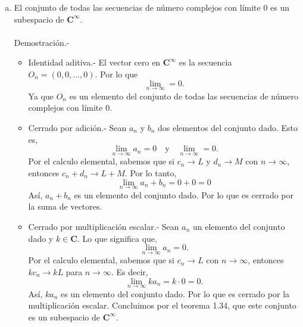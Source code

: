 \begin{enumerate}[\bfseries 1.]
\begin{enumerate}[(a)]
	    \item El conjunto de todas las secuencias de número complejos con límite $0$ es un subespacio de $\textbf{C}^{\infty}$.\\\\
		Demostración.-\;
		\begin{itemize}
		    \item Identidad aditiva.-\; El vector cero en $\textbf{C}^{\infty}$ es la secuencia $O_n=(0,0,\ldots,0)$. Por lo que
			$$\lim_{n\to \infty}=0.$$
		    Ya que $O_n$ es un elemento del conjunto de todas las secuencias de número complejos con límite $0$.

		    \item Cerrado por adición.-\; Sean $a_n$ y $b_n$ dos elementos del conjunto dado. Esto es,
			$$\lim_{n\to \infty}a_n=0\quad \mbox{y}\quad \lim_{n\to \infty}=0.$$
		    Por el calculo elemental, sabemos que si $c_n\to L$ y $d_n\to M$ con $n\to \infty$, entonces $c_n+d_n\to L+M$. Por lo tanto,
		    $$\lim_{n\to \infty}a_n+b_n=0+0=0$$
		    Así, $a_n+b_n$ es un elemento del conjunto dado. Por lo que es cerrado por la suma de vectores.

		    \item Cerrado por multiplicación escalar.-\; Sean $a_n$ un elemento del conjunto dado y $k\in \textbf{C}$. Lo que significa que,
			$$\lim_{n\to \infty}a_n=0.$$
			Por el calculo elemental, sabemos que si $c_n\to L$ con $n\to \infty$, entonces $kc_n\to kL$ para $n\to \infty$. Es decir,
			$$\lim_{n\to \infty}ka_n = k\cdot 0 = 0.$$
			Así, $ka_n$ es un elemento del conjunto dado. Por lo que es cerrado por la multiplicación escalar. Concluimos por el teorema 1.34, que este conjunto es un subespacio de $\textbf{C}^{\infty}$.\\\\
		\end{itemize}

	\end{enumerate}


\end{enumerate}
